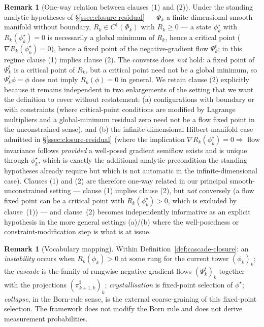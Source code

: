 \documentclass[11pt]{article}
\theoremstyle{definition}
\newtheorem{remark}[theorem]{Remark}
\begin{document}
\begin{remark}[One-way relation between clauses (1) and (2)]\label{rem:clause2-redundancy}
Under the standing analytic hypotheses of \S\ref{ssec:closure-residual} ---
$\Phi_k$ a finite-dimensional smooth manifold without boundary, $R_k \in C^1(\Phi_k)$
with $R_k \geq 0$ --- a state $\phi^\star_k$ with
$R_k(\phi^\star_k) = 0$ is necessarily a global minimum of $R_k$, hence a
critical point ($\nabla R_k(\phi^\star_k) = 0$), hence a fixed point of
the negative-gradient flow $\Psi_k^t$; in this regime clause (1)
implies clause (2). The converse does \emph{not} hold: a fixed point of
$\Psi_k^t$ is a critical point of $R_k$, but a critical point need
not be a global minimum, so $\Psi_k^t \phi = \phi$ does not imply
$R_k(\phi) = 0$ in general. We retain clause (2) explicitly because it
remains independent in two enlargements of the setting that we want
the definition to cover without restatement: (a) configurations with
boundary or with constraints (where critical-point conditions are
modified by Lagrange multipliers and a global-minimum residual zero
need not be a flow fixed point in the unconstrained sense), and
(b) the infinite-dimensional Hilbert-manifold case admitted in
\S\ref{ssec:closure-residual} (where the implication
$\nabla R_k(\phi^\star_k) = 0 \Rightarrow$ flow invariance follows
\emph{provided} a well-posed gradient semiflow exists and is unique
through $\phi^\star_k$, which is exactly the additional analytic
precondition the standing hypotheses already require but which is
not automatic in the infinite-dimensional case). Clauses (1) and
(2) are therefore one-way related in our principal
smooth-unconstrained setting --- clause (1) implies clause (2), but
\emph{not} conversely (a flow fixed point can be a critical point
with $R_k(\phi^\star_k) > 0$, which is excluded by clause~(1)) ---
and clause~(2) becomes independently informative as an explicit
hypothesis in the more general settings (a)/(b) where the
well-posedness or constraint-modification step is what is at issue.
\end{remark}

\begin{remark}[Vocabulary mapping]\label{rem:vocabulary}
Within Definition~\ref{def:cascade-closure}: an \emph{instability}
occurs when $R_k(\phi_k) > 0$ at some rung for the current tower
$(\phi_k)_k$; the \emph{cascade} is the family of rungwise
negative-gradient flows $(\Psi_k^t)_k$ together with the projections
$(\pi^{\sharp}_{k+1, k})_k$; \emph{crystallisation} is
fixed-point selection of $\phi^\star$; \emph{collapse}, in the
Born-rule sense, is the external coarse-graining of this fixed-point
selection. The framework does not modify the Born rule and does not
derive measurement probabilities.
\end{remark}
\end{document}
